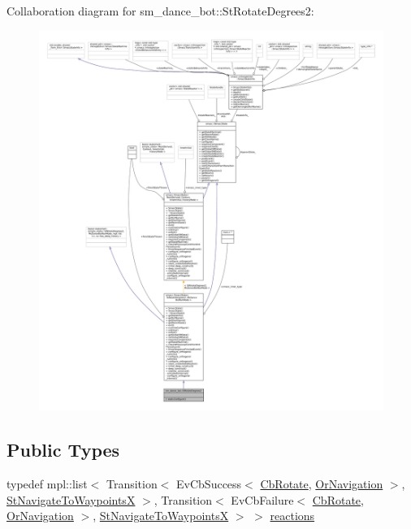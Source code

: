 Collaboration diagram for sm\+\_\+dance\+\_\+bot\+:\+:St\+Rotate\+Degrees2\+:
\nopagebreak
\begin{figure}[H]
\begin{center}
\leavevmode
\includegraphics[width=350pt]{structsm__dance__bot_1_1StRotateDegrees2__coll__graph}
\end{center}
\end{figure}
\subsection*{Public Types}
\begin{DoxyCompactItemize}
\item 
typedef mpl\+::list$<$ Transition$<$ Ev\+Cb\+Success$<$ \hyperlink{classcl__move__base__z_1_1CbRotate}{Cb\+Rotate}, \hyperlink{classsm__dance__bot_1_1OrNavigation}{Or\+Navigation} $>$, \hyperlink{structsm__dance__bot_1_1StNavigateToWaypointsX}{St\+Navigate\+To\+WaypointsX} $>$, Transition$<$ Ev\+Cb\+Failure$<$ \hyperlink{classcl__move__base__z_1_1CbRotate}{Cb\+Rotate}, \hyperlink{classsm__dance__bot_1_1OrNavigation}{Or\+Navigation} $>$, \hyperlink{structsm__dance__bot_1_1StNavigateToWaypointsX}{St\+Navigate\+To\+WaypointsX} $>$ $>$ \hyperlink{structsm__dance__bot_1_1StRotateDegrees2_a7619f7987ad4ff6a50fbf6e6c79adcbd}{reactions}
\end{DoxyCompactItemize}
